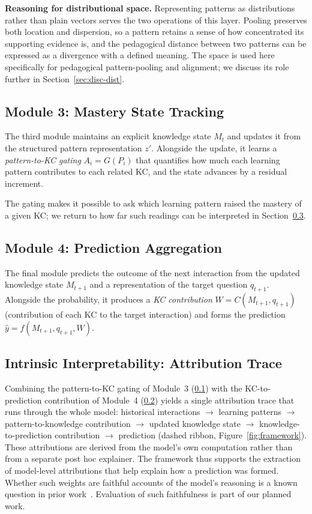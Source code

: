 \documentclass[conference]{IEEEtran}
\begin{document}
\smallskip
\noindent\textbf{Reasoning for distributional space.} Representing patterns as distributions rather than plain vectors serves the two operations of this layer. Pooling preserves both location and dispersion, so a pattern retains a sense of how concentrated its supporting evidence is, and the pedagogical distance between two patterns can be expressed as a divergence with a defined meaning. The space is used here specifically for pedagogical pattern-pooling and alignment; we discuss its role further in Section~\ref{sec:disc-dist}.

\subsection{Module 3: Mastery State Tracking}
\label{sec:mst}

The third module maintains an explicit knowledge state $M_t$ and updates it from the structured pattern representation $z'$. Alongside the update, it learns a \emph{pattern-to-KC gating} $A_i = G(P_i)$ that quantifies how much each learning pattern contributes to each related KC, and the state advances by a residual increment.

The gating makes it possible to ask which learning pattern raised the mastery of a given KC; we return to how far such readings can be interpreted in Section~\ref{sec:interp}.

\subsection{Module 4: Prediction Aggregation}
\label{sec:pred}

The final module predicts the outcome of the next interaction from the updated knowledge state $M_{t+1}$ and a representation of the target question $q_{t+1}$. Alongside the probability, it produces a \emph{KC contribution} $W = C(M_{t+1}, q_{t+1})$ (contribution of each KC to the target interaction) and forms the prediction $\hat{y} = f(M_{t+1}, q_{t+1}, W)$.

\subsection{Intrinsic Interpretability: Attribution Trace}
\label{sec:interp}

Combining the pattern-to-KC gating of Module~3 (\ref{sec:mst}) with the KC-to-prediction contribution of Module~4 (\ref{sec:pred}) yields a single attribution trace that runs through the whole model: historical interactions $\rightarrow$ learning patterns $\rightarrow$ pattern-to-knowledge contribution $\rightarrow$ updated knowledge state $\rightarrow$ knowledge-to-prediction contribution $\rightarrow$ prediction (dashed ribbon, Figure~\ref{fig:framework}). These attributions are derived from the model's own computation rather than from a separate post hoc explainer. The framework thus supports the extraction of model-level attributions that help explain how a prediction was formed. Whether such weights are faithful accounts of the model's reasoning is a known question in prior work~\cite{jain2019attention,wiegreffe2019attention}. Evaluation of such faithfulness is part of our planned work.
\end{document}

